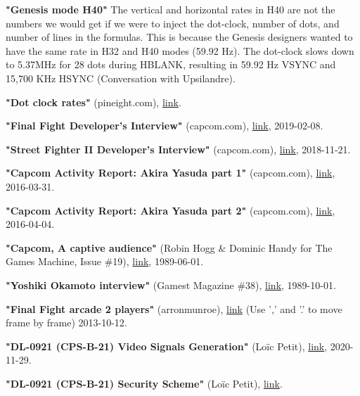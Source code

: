 \begin{thebibliography}{999}
  \textbf{"Genesis mode H40"}
  The vertical and horizontal rates in H40 are not the numbers we would get if we were to inject the dot-clock, number of dots, and number of lines in the formulas. This is because the Genesis designers wanted to have the same rate in H32 and H40 modes (59.92 Hz). The dot-clock slows down to 5.37MHz for 28 dots during HBLANK, resulting in 59.92 Hz VSYNC and 15,700 KHz HSYNC (Conversation with Upsilandre).

  \textbf{"Dot clock rates"} (pineight.com),
  \href{https://pineight.com/mw/page/Dot_clock_rates.xhtml}{link}.

  \textbf{"Final Fight Developer's Interview"} (capcom.com),
  \href{https://game.capcom.com/cfn/sfv/column/132673?lang=en}{link},
  2019-02-08.

  \textbf{"Street Fighter II Developer's Interview"} (capcom.com),
  \href{https://game.capcom.com/cfn/sfv/column/132595?lang=en}{link},
  2018-11-21.

  \textbf{"Capcom Activity Report: Akira Yasuda part 1"} (capcom.com),
  \href{https://game.capcom.com/cfn/sfv/column/112429}{link},
  2016-03-31.

  \textbf{"Capcom Activity Report: Akira Yasuda part 2"} (capcom.com),
  \href{https://game.capcom.com/cfn/sfv/column/112432}{link},
  2016-04-04.

  \textbf{"Capcom, A captive audience"} (Robin Hogg \& Dominic Handy for The Games Machine, Issue \#19),
  \href{https://archive.org/details/the-games-machine-19/page/n23/mode/2up}{link},
  1989-06-01.

  \textbf{"Yoshiki Okamoto interview"} (Gamest Magazine \#38),
  \href{https://retrocdn.net/images/9/91/Gamest_JP_038.pdf}{link},
  1989-10-01.

  \textbf{"Final Fight arcade 2 players"} (arronmunroe),
  \href{https://youtu.be/HyAHGHo22Og?t=1707}{link} (Use ',' and '.' to move frame by frame)
  2013-10-12.

  \textbf{"DL-0921 (CPS-B-21) Video Signals Generation"} (Lo\"{i}c Petit),
  \href{https://gitlab.com/loic.petit/cps2-reverse/-/blob/master/DLs/DL-0921/doc/video-signals.md}{link},
  2020-11-29.

  \textbf{"DL-0921 (CPS-B-21) Security Scheme"} (Lo\"{i}c Petit),
  \href{https://gitlab.com/loic.petit/cps2-reverse/-/blob/master/DLs/DL-0921/doc/security-scheme.md}{link}.


\end{thebibliography}
